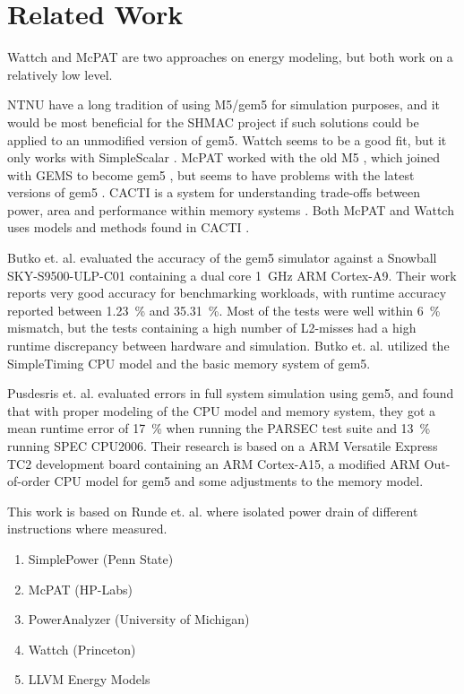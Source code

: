 \section{Related Work}

Wattch \cite{brooks2000wattch} and McPAT \cite{hpmcpat,li2013mcpat} are two
approaches on energy modeling, but both work on a relatively low level.

NTNU have a long tradition of using M5/gem5 for simulation purposes, and it
would be most beneficial for the SHMAC project if such solutions could be
applied to an unmodified version of gem5. Wattch seems to be a good fit, but it
only works with SimpleScalar \cite{wattchanalysis}. McPAT worked with the old M5
\cite{m5mcpatparser}, which joined with GEMS to become gem5 \cite{gem5hipeac},
but seems to have problems with the latest versions of gem5
\cite{mcpatgem5problems}. CACTI is a system for understanding trade-offs between
power, area and performance within memory systems
\cite{hpcacti,muralimanohar2010memory}. Both McPAT and Wattch uses models and
methods found in CACTI \cite{li2009mcpat}.



Butko et. al. \cite{butko2012accuracy} evaluated the accuracy of the gem5
simulator against a Snowball SKY-S9500-ULP-C01 containing a dual core 1~GHz ARM
Cortex-A9.  Their work reports very good accuracy for benchmarking workloads,
with runtime accuracy reported between 1.23~\% and 35.31~\%.  Most of the tests
were well within 6~\% mismatch, but the tests containing a high number of
L2-misses had a high runtime discrepancy between hardware and simulation. Butko et. al.
utilized the SimpleTiming CPU model and the basic memory system of gem5.

Pusdesris et. al. \cite{pusdesrissources} evaluated errors in full system
simulation using gem5, and found that with proper modeling of the CPU model
and memory system, they got a mean runtime error of 17~\% when running the PARSEC
test suite and 13~\% running SPEC CPU2006. Their research is based on a ARM
Versatile Express TC2 development board containing an ARM Cortex-A15, a modified
ARM Out-of-order CPU model for gem5 and some adjustments to the memory model.

This work is based on Runde et. al. \cite{rundehvatum2013exploring} where isolated
power drain of different instructions where measured.

\begin{enumerate}
    \item SimplePower (Penn State)
    \item McPAT (HP-Labs)
    \item PowerAnalyzer (University of Michigan)
    \item Wattch (Princeton)
    \item LLVM Energy Models
\end{enumerate}
